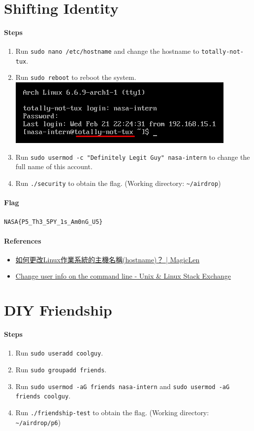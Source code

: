 \documentclass[12pt, a4paper]{article}
\begin{document}
  \section{Shifting Identity}
  \paragraph{Steps}
  \begin{enumerate}
    \item Run \verb|sudo nano /etc/hostname| and change the hostname to
      \verb|totally-not-tux|.
    \item Run \verb|sudo reboot| to reboot the system.\\
      \includegraphics[width=0.6\linewidth]{sa_p5_hostname_changed.png}
    \item Run \verb|sudo usermod -c "Definitely Legit Guy" nasa-intern| to
      change the full name of this account.
    \item Run \verb|./security| to obtain the flag.
      (Working directory: \verb|~/airdrop|)
  \end{enumerate}
  \paragraph{Flag} \verb|NASA{P5_Th3_5PY_1s_Am0nG_U5}|
  \paragraph{References}
  \begin{itemize}
    \item \href{https://magiclen.org/linux-change-hostname/}{如何更改Linux作業系統的主機名稱(hostname)？ | MagicLen}
    \item \href{https://unix.stackexchange.com/questions/149665/change-user-info-on-the-command-line}{Change user info on the command line - Unix \& Linux Stack Exchange}
  \end{itemize}

  \section{DIY Friendship}
  \paragraph{Steps}
  \begin{enumerate}
    \item Run \verb|sudo useradd coolguy|.
    \item Run \verb|sudo groupadd friends|.
    \item Run \verb|sudo usermod -aG friends nasa-intern| and
      \verb|sudo usermod -aG friends coolguy|.
    \item Run \verb|./friendship-test| to obtain the flag.
      (Working directory: \verb|~/airdrop/p6|)
  \end{enumerate}
\end{document}
